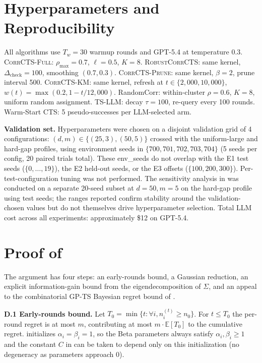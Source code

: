\documentclass{article}
\theoremstyle{plain}
\theoremstyle{definition}
\theoremstyle{remark}
\newcommand{\E}{\mathbb{E}}
\newcommand{\CorrFull}{\textsc{CorrCTS-Full}}
\newcommand{\RobustCorr}{\textsc{RobustCorrCTS}}
\newcommand{\EdgePrune}{\textsc{CorrCTS-Prune}}
\newcommand{\KMRefine}{\textsc{CorrCTS-KM}}
\begin{document}
\section{Hyperparameters and Reproducibility}\label{app:hp}

All algorithms use $T_w = 30$ warmup rounds and GPT-5.4 at temperature 0.3.
\CorrFull: $\rho_{\max} = 0.7$, $\ell = 0.5$, $K = 8$.
\RobustCorr: same kernel, $\Delta_{\mathrm{check}} = 100$, smoothing $(0.7, 0.3)$.
\EdgePrune: same kernel, $\beta = 2$, prune interval 500.
\KMRefine: same kernel, refresh at $t \in \{2{,}000, 10{,}000\}$, $w(t) = \max(0.2, 1 - t/12{,}000)$.
RandomCorr: within-cluster $\rho = 0.6$, $K = 8$, uniform random assignment.
TS-LLM: decay $\tau = 100$, re-query every 100 rounds.
Warm-Start CTS: 5 pseudo-successes per LLM-selected arm.

\textbf{Validation set.}
Hyperparameters were chosen on a disjoint validation grid of 4 configurations: $(d,m) \in \{(25,3),(50,5)\}$ crossed with the uniform-large and hard-gap profiles, using environment seeds in $\{700, 701, 702, 703, 704\}$ (5 seeds per config, 20 paired trials total).
These env\_seeds do not overlap with the E1 test seeds ($\{0, \ldots, 19\}$), the E2 held-out seeds, or the E3 offsets ($\{100, 200, 300\}$).
Per-test-configuration tuning was not performed.
The sensitivity analysis in  was conducted on a separate 20-seed subset at $d=50, m=5$ on the hard-gap profile using test seeds; the ranges reported confirm stability around the validation-chosen values but do not themselves drive hyperparameter selection.
Total LLM cost across all experiments: approximately \$12 on GPT-5.4.

\section{Proof of }\label{app:bayes}

The argument has four steps: an early-rounds bound, a Gaussian reduction, an explicit information-gain bound from the eigendecomposition of $\Sigma$, and an appeal to the combinatorial GP-TS Bayesian regret bound of \citet{sandberg2025bayesian}.

\textbf{D.1 Early-rounds bound.}
Let $T_0 = \min\{t : \forall i, n_i^{(t)} \geq n_0\}$.
For $t \leq T_0$ the per-round regret is at most $m$, contributing at most $m \cdot \E[T_0]$ to the cumulative regret.
 initializes $\alpha_i = \beta_i = 1$, so the Beta parameters always satisfy $\alpha_i, \beta_i \geq 1$ and the constant $C$ in  can be taken to depend only on this initialization (no degeneracy as parameters approach $0$).
\end{document}
